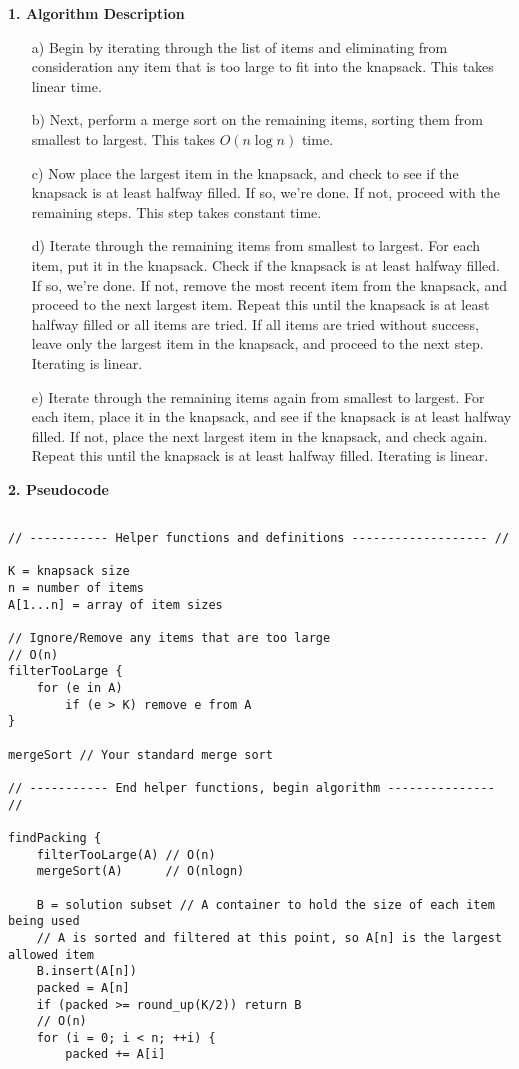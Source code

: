 \documentclass[11pt]{article}
\begin{document}
\begin{enumerate}
\textbf{1. Algorithm Description}
\begin{itemize}
\item[a)] Begin by iterating through the list of items and eliminating from consideration any item that is too large to fit into the knapsack. This takes linear time.
\item[b)] Next, perform a merge sort on the remaining items, sorting them from smallest to largest. This takes 
$O(n\log n)$ time.
\item[c)] Now place the largest item in the knapsack, and check to see if the knapsack is at least halfway filled. If so, we're done. If not, proceed with the remaining steps. This step takes constant time.
\item[d)] Iterate through the remaining items from smallest to largest. For each item, put it in the knapsack. Check if the knapsack is at least halfway filled. If so, we're done. If not, remove the most recent item from the knapsack, and proceed to the next largest item. Repeat this until the knapsack is at least halfway filled or all items are tried. If all items are tried without success, leave only the largest item in the knapsack, and proceed to the next step. Iterating is linear.
\item[e)] Iterate through the remaining items again from smallest to largest. For each item, place it in the knapsack, and see if the knapsack is at least halfway filled. If not, place the next largest item in the knapsack, and check again. Repeat this until the knapsack is at least halfway filled. Iterating is linear.
\end{itemize} 

\pagebreak

\textbf{2. Pseudocode}
\begin{verbatim}

// ----------- Helper functions and definitions ------------------- //

K = knapsack size
n = number of items
A[1...n] = array of item sizes

// Ignore/Remove any items that are too large
// O(n)
filterTooLarge {
    for (e in A)
        if (e > K) remove e from A
}

mergeSort // Your standard merge sort

// ----------- End helper functions, begin algorithm --------------- //

findPacking {
    filterTooLarge(A) // O(n)
    mergeSort(A)      // O(nlogn)

    B = solution subset // A container to hold the size of each item being used
    // A is sorted and filtered at this point, so A[n] is the largest allowed item
    B.insert(A[n]) 
    packed = A[n]
    if (packed >= round_up(K/2)) return B
    // O(n)
    for (i = 0; i < n; ++i) {
        packed += A[i]


\end{verbatim}
\end{enumerate}
\end{document}
